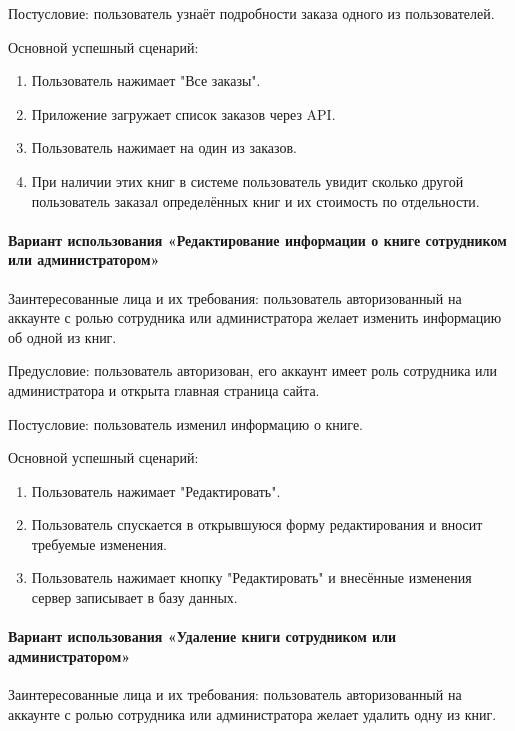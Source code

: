Постусловие: пользователь узнаёт подробности заказа одного из пользователей.

Основной успешный сценарий:

\begin{enumerate}
	\item Пользователь нажимает "Все заказы".
	\item Приложение загружает список заказов через API.
	\item Пользователь нажимает на один из заказов.
	\item При наличии этих книг в системе пользователь увидит сколько другой пользователь заказал определённых книг и их стоимость по отдельности.
\end{enumerate}


\paragraph{Вариант использования «Редактирование информации о книге сотрудником или администратором»}

Заинтересованные лица и их требования: пользователь авторизованный на аккаунте с ролью сотрудника или администратора желает изменить информацию об одной из книг.

Предусловие: пользователь авторизован, его аккаунт имеет роль сотрудника или администратора и открыта главная страница сайта.

Постусловие: пользователь изменил информацию о книге.

Основной успешный сценарий:

\begin{enumerate}
	\item Пользователь нажимает "Редактировать".
	\item Пользователь спускается в открывшуюся форму редактирования и вносит требуемые изменения.
	\item Пользователь нажимает кнопку "Редактировать" и внесённые изменения сервер записывает в базу данных.
\end{enumerate}


\paragraph{Вариант использования «Удаление книги сотрудником или администратором»}

Заинтересованные лица и их требования: пользователь авторизованный на аккаунте с ролью сотрудника или администратора желает удалить одну из книг.

